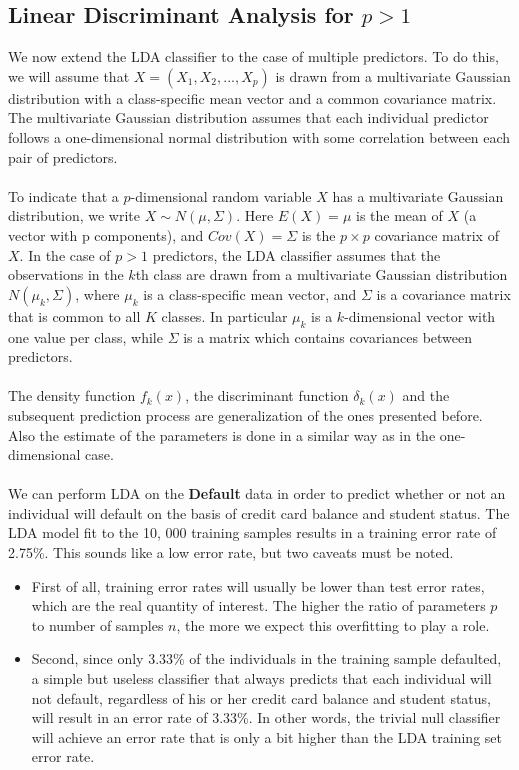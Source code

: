 \subsection{Linear Discriminant Analysis for $p >1$}
We now extend the LDA classifier to the case of multiple predictors. To
do this, we will assume that $X = (X_1, X_2,...,X_p)$ is drawn from a multivariate Gaussian distribution with a class-specific mean vector and a common covariance matrix. The multivariate Gaussian distribution assumes that each individual predictor follows a one-dimensional normal distribution  with some correlation between each pair of predictors.\\\\
To indicate that a $p$-dimensional random variable $X$ has a multivariate Gaussian distribution, we write $X \sim N(\mu, \Sigma)$. Here $E(X) = \mu$ is the mean of $X$ (a vector with p components), and $Cov(X) = \Sigma$ is the $p \times p$ covariance matrix of $X$. 
In the case of $p > 1$ predictors, the LDA classifier assumes that the
observations in the $k$th class are drawn from a multivariate Gaussian distribution $N(\mu_k, \Sigma)$, where $\mu_k$ is a class-specific mean vector, and $\Sigma$ is a covariance matrix that is common to all $K$ classes. In particular $\mu_k$ is a $k$-dimensional vector with one value per class, while $\Sigma$ is a matrix which contains covariances between predictors.
\\\\
The density function $f_k(x)$, the discriminant function $\delta_k(x)$ and the subsequent prediction process are generalization of the ones presented before. Also the estimate of the parameters is done in a similar way as in the one-dimensional case.\\\\
We can perform LDA on the \textbf{Default} data in order to predict whether
or not an individual will default on the basis of credit card balance and student status. The LDA model fit to the 10, 000 training samples results
in a training error rate of 2.75\%. This sounds like a low error rate, but two caveats must be noted.
\begin{itemize}
    \item First of all, training error rates will usually be lower than test error rates, which are the real quantity of interest. The higher the ratio of parameters $p$ to number of samples $n$, the more we expect this overfitting to play a role.

    \item Second, since only 3.33\% of the individuals in the training sample defaulted, a simple but useless classifier that always predicts that each individual will not default, regardless of his or her credit card balance and student status, will result in an error rate of 3.33\%. In other words, the trivial null classifier will achieve an error rate that is only a bit higher than the LDA training set error rate.
\end{itemize}
